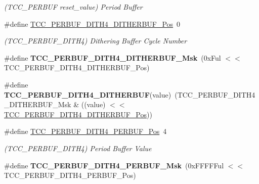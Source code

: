 \begin{DoxyCompactItemize}
\begin{DoxyCompactList}\small\item\em (T\+C\+C\+\_\+\+P\+E\+R\+B\+U\+F reset\+\_\+value) Period Buffer \end{DoxyCompactList}\item 
\hypertarget{group___s_a_m_l21___t_c_c_ga71d043341d4e9a4b070d0179368c5563}{}\#define \hyperlink{group___s_a_m_l21___t_c_c_ga71d043341d4e9a4b070d0179368c5563}{T\+C\+C\+\_\+\+P\+E\+R\+B\+U\+F\+\_\+\+D\+I\+T\+H4\+\_\+\+D\+I\+T\+H\+E\+R\+B\+U\+F\+\_\+\+Pos}~0\label{group___s_a_m_l21___t_c_c_ga71d043341d4e9a4b070d0179368c5563}

\begin{DoxyCompactList}\small\item\em (T\+C\+C\+\_\+\+P\+E\+R\+B\+U\+F\+\_\+\+D\+I\+T\+H4) Dithering Buffer Cycle Number \end{DoxyCompactList}\item 
\hypertarget{group___s_a_m_l21___t_c_c_gafc22048e1b85658a3ec0127e26588603}{}\#define {\bfseries T\+C\+C\+\_\+\+P\+E\+R\+B\+U\+F\+\_\+\+D\+I\+T\+H4\+\_\+\+D\+I\+T\+H\+E\+R\+B\+U\+F\+\_\+\+Msk}~(0x\+Ful $<$$<$ T\+C\+C\+\_\+\+P\+E\+R\+B\+U\+F\+\_\+\+D\+I\+T\+H4\+\_\+\+D\+I\+T\+H\+E\+R\+B\+U\+F\+\_\+\+Pos)\label{group___s_a_m_l21___t_c_c_gafc22048e1b85658a3ec0127e26588603}

\item 
\hypertarget{group___s_a_m_l21___t_c_c_ga05ee1881e772257e4d19a83c291a1760}{}\#define {\bfseries T\+C\+C\+\_\+\+P\+E\+R\+B\+U\+F\+\_\+\+D\+I\+T\+H4\+\_\+\+D\+I\+T\+H\+E\+R\+B\+U\+F}(value)~(T\+C\+C\+\_\+\+P\+E\+R\+B\+U\+F\+\_\+\+D\+I\+T\+H4\+\_\+\+D\+I\+T\+H\+E\+R\+B\+U\+F\+\_\+\+Msk \& ((value) $<$$<$ \hyperlink{group___s_a_m_l21___t_c_c_ga71d043341d4e9a4b070d0179368c5563}{T\+C\+C\+\_\+\+P\+E\+R\+B\+U\+F\+\_\+\+D\+I\+T\+H4\+\_\+\+D\+I\+T\+H\+E\+R\+B\+U\+F\+\_\+\+Pos}))\label{group___s_a_m_l21___t_c_c_ga05ee1881e772257e4d19a83c291a1760}

\item 
\hypertarget{group___s_a_m_l21___t_c_c_ga04002d2414ad4d56431fbb9b833d8cca}{}\#define \hyperlink{group___s_a_m_l21___t_c_c_ga04002d2414ad4d56431fbb9b833d8cca}{T\+C\+C\+\_\+\+P\+E\+R\+B\+U\+F\+\_\+\+D\+I\+T\+H4\+\_\+\+P\+E\+R\+B\+U\+F\+\_\+\+Pos}~4\label{group___s_a_m_l21___t_c_c_ga04002d2414ad4d56431fbb9b833d8cca}

\begin{DoxyCompactList}\small\item\em (T\+C\+C\+\_\+\+P\+E\+R\+B\+U\+F\+\_\+\+D\+I\+T\+H4) Period Buffer Value \end{DoxyCompactList}\item 
\hypertarget{group___s_a_m_l21___t_c_c_ga0e714e3c2e7f85695254078b58f97a93}{}\#define {\bfseries T\+C\+C\+\_\+\+P\+E\+R\+B\+U\+F\+\_\+\+D\+I\+T\+H4\+\_\+\+P\+E\+R\+B\+U\+F\+\_\+\+Msk}~(0x\+F\+F\+F\+F\+Ful $<$$<$ T\+C\+C\+\_\+\+P\+E\+R\+B\+U\+F\+\_\+\+D\+I\+T\+H4\+\_\+\+P\+E\+R\+B\+U\+F\+\_\+\+Pos)\label{group___s_a_m_l21___t_c_c_ga0e714e3c2e7f85695254078b58f97a93}


\end{DoxyCompactItemize}
